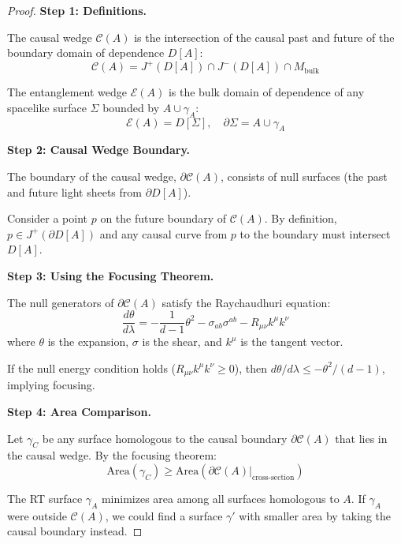 \documentclass[12pt,a4paper]{article}
\begin{document}
\begin{proof}
\textbf{Step 1: Definitions.}

The causal wedge $\mathcal{C}(A)$ is the intersection of the causal past and future of the boundary domain of dependence $D[A]$:
\begin{equation}
\mathcal{C}(A) = J^+(D[A]) \cap J^-(D[A]) \cap M_{\text{bulk}}
\end{equation}

The entanglement wedge $\mathcal{E}(A)$ is the bulk domain of dependence of any spacelike surface $\Sigma$ bounded by $A \cup \gamma_A$:
\begin{equation}
\mathcal{E}(A) = D[\Sigma], \quad \partial\Sigma = A \cup \gamma_A
\end{equation}

\textbf{Step 2: Causal Wedge Boundary.}

The boundary of the causal wedge, $\partial\mathcal{C}(A)$, consists of null surfaces (the past and future light sheets from $\partial D[A]$).

Consider a point $p$ on the future boundary of $\mathcal{C}(A)$. By definition, $p \in J^+(\partial D[A])$ and any causal curve from $p$ to the boundary must intersect $D[A]$.

\textbf{Step 3: Using the Focusing Theorem.}

The null generators of $\partial \mathcal{C}(A)$ satisfy the Raychaudhuri equation:
\begin{equation}
\frac{d\theta}{d\lambda} = -\frac{1}{d-1}\theta^2 - \sigma_{ab}\sigma^{ab} - R_{\mu\nu}k^\mu k^\nu
\end{equation}
where $\theta$ is the expansion, $\sigma$ is the shear, and $k^\mu$ is the tangent vector.

If the null energy condition holds ($R_{\mu\nu}k^\mu k^\nu \geq 0$), then $d\theta/d\lambda \leq -\theta^2/(d-1)$, implying focusing.

\textbf{Step 4: Area Comparison.}

Let $\gamma_C$ be any surface homologous to the causal boundary $\partial\mathcal{C}(A)$ that lies in the causal wedge. By the focusing theorem:
\begin{equation}
\text{Area}(\gamma_C) \geq \text{Area}(\partial\mathcal{C}(A)|_{\text{cross-section}})
\end{equation}

The RT surface $\gamma_A$ minimizes area among all surfaces homologous to $A$. If $\gamma_A$ were outside $\mathcal{C}(A)$, we could find a surface $\gamma'$ with smaller area by taking the causal boundary instead.


\end{proof}
\end{document}
